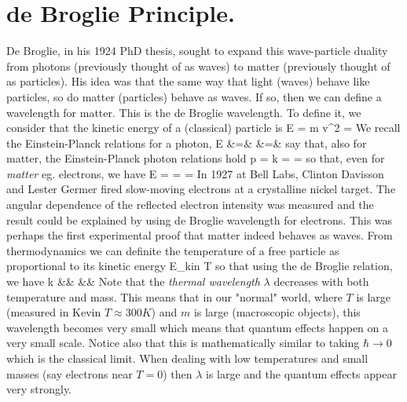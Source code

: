 \documentclass{Textbook}
\begin{document}
\section{de Broglie Principle.}
De Broglie, in his 1924 PhD thesis, sought to expand this wave-particle duality from photons (previously thought of as waves) to matter (previously thought of as particles). His idea was that the same way that light (waves) behave like particles, so do matter (particles) behave as waves. If so, then we can define a wavelength for matter. This is the de Broglie wavelength. To define it, we consider that the kinetic energy of a (classical) particle is
\be
E =  m v^2 = 
\ee
We recall the Einstein-Planck relations for a photon,
\bea
E &=& \hbar \omega \nn
{} &=& \hbar {}
\eea
say that, also for matter, the Einstein-Planck photon relations hold
\be
p = \hbar k \quad \longrightarrow \lambda =  = \nn
\ee
so that, even for \emph{matter} eg. electrons, we have
\be
E = \hbar \omega =  =  
\label{eq:debro}
\ee
In 1927 at Bell Labs, Clinton Davisson and Lester Germer fired slow-moving electrons at a crystalline nickel target. The angular dependence of the reflected electron intensity was measured and the result could be explained by using de Broglie wavelength for electrons. This was perhaps the first experimental proof that matter indeed behaves as waves.\nl
From thermodynamics we can definite the temperature of a free particle as proportional to its kinetic energy
\be
E_{kin} \propto T
\ee
so that using the de Broglie relation, we have
\bea
k &\propto&  \propto {}\nn
\lambda &\propto&  \propto {} 
\eea
Note that the \emph{thermal wavelength} $\lambda$ decreases with both temperature and mass. This means that in our "normal" world, where $T$ is large (measured in Kevin $T\approx300K$) and $m$ is large (macroscopic objects), this wavelength becomes very small which means that quantum effects happen on a very small scale. Notice also that this is mathematically similar to taking $\hbar\rightarrow 0$ which is the classical limit. When dealing with low temperatures and small masses (say electrons near $T=0$) then $\lambda$ is large and the quantum effects appear very strongly.
\end{document}
